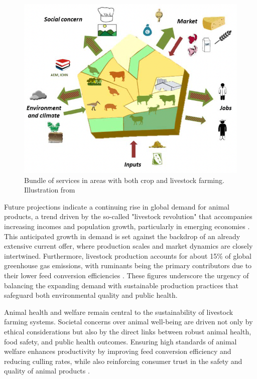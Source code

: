 \begin{figure}[h]
  \includegraphics[width=\linewidth]{figures/chap1/chap1-livestockfarming.png}
  \caption{Bundle of services in areas with both crop and livestock farming. Illustration from \cite{INRA_Livestock_Production}}
  \label{fig:chap1-livestock}
\end{figure}

Future projections indicate a continuing rise in global demand for animal products, a trend driven by the so-called "livestock revolution" that accompanies increasing incomes and population growth, particularly in emerging economies \cite{Delgado2016}. This anticipated growth in demand is set against the backdrop of an already extensive current offer, where production scales and market dynamics are closely intertwined. Furthermore, livestock production accounts for about 15\% of global greenhouse gas emissions, with ruminants being the primary contributors due to their lower feed conversion efficiencies \cite{Gerber2013}. These figures underscore the urgency of balancing the expanding demand with sustainable production practices that safeguard both environmental quality and public health.

Animal health and welfare remain central to the sustainability of livestock farming systems. Societal concerns over animal well-being are driven not only by ethical considerations but also by the direct links between robust animal health, food safety, and public health outcomes. Ensuring high standards of animal welfare enhances productivity by improving feed conversion efficiency and reducing culling rates, while also reinforcing consumer trust in the safety and quality of animal products \cite{FAO2017}.

